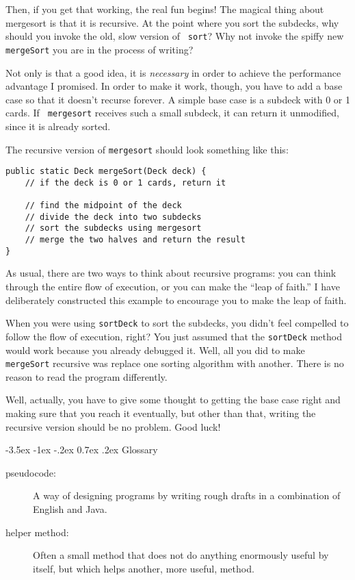 \documentclass{book}
\makeatletter
\renewcommand{\section}{\@startsection 
    {section} {1} {0mm}%
    {-3.5ex \@plus -1ex \@minus -.2ex}%
    {0.7ex \@plus.2ex}%
    {\normalfont\Large\bfseries}}
\makeatother
\begin{document}
Then, if you get that working, the real fun begins!  The magical thing
about mergesort is that it is recursive.  At the point where you sort
the subdecks, why should you invoke the old, slow version of {\tt
sort}?  Why not invoke the spiffy new {\tt mergeSort} you are in the
process of writing?


Not only is that a good idea, it is {\em necessary} in order to
achieve the performance advantage I promised.  In order to make it
work, though, you have to add a base case so that it doesn't recurse
forever.  A simple base case is a subdeck with 0 or 1 cards.  If {\tt
mergesort} receives such a small subdeck, it can return it
unmodified, since it is already sorted.

The recursive version of {\tt mergesort} should look something
like this:

\begin{verbatim}
public static Deck mergeSort(Deck deck) {
    // if the deck is 0 or 1 cards, return it

    // find the midpoint of the deck
    // divide the deck into two subdecks
    // sort the subdecks using mergesort
    // merge the two halves and return the result
}
\end{verbatim}
%
As usual, there are two ways to think about recursive programs:
you can think through the entire flow of execution, or you
can make the ``leap of faith.''  I have deliberately constructed
this example to encourage you to make the leap of faith.


When you were using {\tt sortDeck} to sort the subdecks, you didn't
feel compelled to follow the flow of execution, right?  You just
assumed that the {\tt sortDeck} method would work because you already
debugged it.  Well, all you did to make {\tt mergeSort} recursive was
replace one sorting algorithm with another.  There is no reason to read
the program differently.

Well, actually, you have to give some thought to getting the
base case right and making sure that you reach it eventually,
but other than that, writing the recursive version should be
no problem.  Good luck!


\section{Glossary}

\begin{description}

\item[pseudocode:]  A way of designing programs by writing
rough drafts in a combination of English and Java.

\item[helper method:]  Often a small method that does not
do anything enormously useful by itself, but which helps
another, more useful, method.



\end{description}
\end{document}
